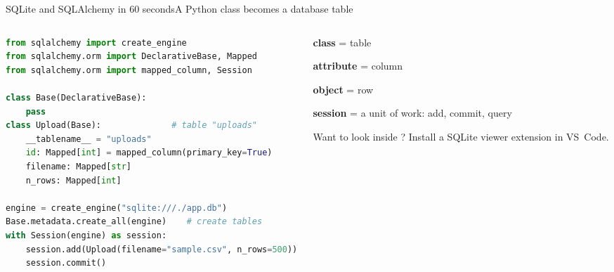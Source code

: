 \documentclass[aspectratio=169,11pt]{beamer}
\newcommand{\file}[1]{\leavevmode{\ttfamily\color{accent}#1}}
\begin{document}
\begin{frame}[fragile]{SQLite and SQLAlchemy in 60 seconds}{A Python class becomes a database table}
  \vspace{2pt}
  \begin{columns}[T]
    \begin{column}{0.63\textwidth}
\begin{lstlisting}[language=Python,morekeywords={with,as},aboveskip=0pt]
from sqlalchemy import create_engine
from sqlalchemy.orm import DeclarativeBase, Mapped
from sqlalchemy.orm import mapped_column, Session

class Base(DeclarativeBase):
    pass
class Upload(Base):              # table "uploads"
    __tablename__ = "uploads"
    id: Mapped[int] = mapped_column(primary_key=True)
    filename: Mapped[str]
    n_rows: Mapped[int]

engine = create_engine("sqlite:///./app.db")
Base.metadata.create_all(engine)    # create tables
with Session(engine) as session:
    session.add(Upload(filename="sample.csv", n_rows=500))
    session.commit()
\end{lstlisting}
    \end{column}
    \begin{column}{0.33\textwidth}
      \begin{keybox}
        \textbf{class} = table\par
        \textbf{attribute} = column\par
        \textbf{object} = row\par
        \textbf{session} = a unit of work: add, commit, query
      \end{keybox}
      \addvspace{5pt}
      \begin{infobox}
        Want to look inside \file{app.db}? Install a SQLite viewer extension in VS~Code.
      \end{infobox}
    \end{column}
  \end{columns}
\end{frame}
\end{document}
